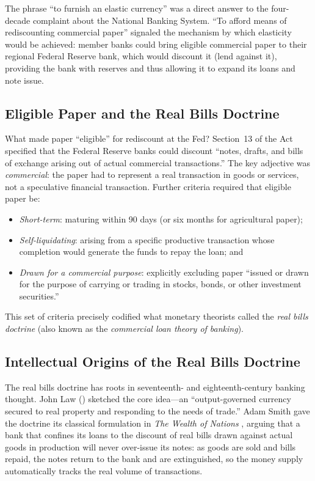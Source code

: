 \documentclass[12pt]{article}
\begin{document}
The phrase ``to furnish an elastic currency'' was a direct answer to the
four-decade complaint about the National Banking System.  ``To afford means of
rediscounting commercial paper'' signaled the mechanism by which elasticity would be
achieved: member banks could bring eligible commercial paper to their regional
Federal Reserve bank, which would discount it (lend against it), providing the
bank with reserves and thus allowing it to expand its loans and note issue.

\subsection{Eligible Paper and the Real Bills Doctrine}

What made paper ``eligible'' for rediscount at the Fed?  Section~13 of the
Act specified that the Federal Reserve banks could discount ``notes, drafts, and
bills of exchange arising out of actual commercial transactions.''  The key
adjective was \emph{commercial}: the paper had to represent a real transaction in
goods or services, not a speculative financial transaction.  Further criteria
required that eligible paper be:
\begin{itemize}
  \item \emph{Short-term}: maturing within 90 days (or six months for agricultural
    paper);
  \item \emph{Self-liquidating}: arising from a specific productive transaction
    whose completion would generate the funds to repay the loan; and
  \item \emph{Drawn for a commercial purpose}: explicitly excluding paper ``issued
    or drawn for the purpose of carrying or trading in stocks, bonds, or other
    investment securities.''
\end{itemize}

This set of criteria precisely codified what monetary theorists called the
\emph{real bills doctrine} (also known as the \emph{commercial loan theory of
banking}).

\subsection{Intellectual Origins of the Real Bills Doctrine}

The real bills doctrine has roots in seventeenth- and eighteenth-century banking
thought.  John Law (\citeyear{law1720}) sketched the core idea---an
``output-governed currency secured to real property and responding to the needs of
trade.''  Adam Smith gave the doctrine its classical formulation in \emph{The
Wealth of Nations} \citep[Book~II, Ch.~2]{smith1776}, arguing that a bank that confines its loans to
the discount of real bills drawn against actual goods in production will never
over-issue its notes: as goods are sold and bills repaid, the notes return to the
bank and are extinguished, so the money supply automatically tracks the real volume
of transactions.
\end{document}
